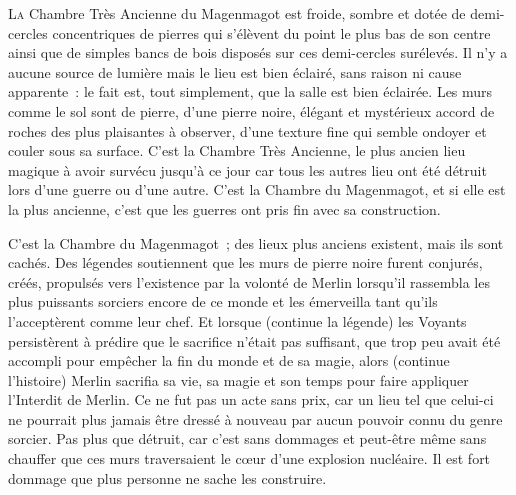 
\lettrine{L}{a} Chambre Très Ancienne du Magenmagot est froide, sombre et dotée de demi-cercles concentriques de pierres qui s'élèvent du point le plus bas de son centre ainsi que de simples bancs de bois disposés sur ces demi-cercles surélevés. Il n'y a aucune source de lumière mais le lieu est bien éclairé, sans raison ni cause apparente~: le fait est, tout simplement, que la salle est bien éclairée. Les murs comme le sol sont de pierre, d'une pierre noire, élégant et mystérieux accord de roches des plus plaisantes à observer, d'une texture fine qui semble ondoyer et couler sous sa surface. C'est la Chambre Très Ancienne, le plus ancien lieu magique à avoir survécu jusqu'à ce jour car tous les autres lieu ont été détruit lors d'une guerre ou d'une autre. C'est la Chambre du Magenmagot, et si elle est la plus ancienne, c'est que les guerres ont pris fin avec sa construction.

C'est la Chambre du Magenmagot~; des lieux plus anciens existent, mais ils sont cachés. Des légendes soutiennent que les murs de pierre noire furent conjurés, créés, propulsés vers l'existence par la volonté de Merlin lorsqu'il rassembla les plus puissants sorciers encore de ce monde et les émerveilla tant qu'ils l'acceptèrent comme leur chef. Et lorsque (continue la légende) les Voyants persistèrent à prédire que le sacrifice n'était pas suffisant, que trop peu avait été accompli pour empêcher la fin du monde et de sa magie, alors (continue l'histoire) Merlin sacrifia sa vie, sa magie et son temps pour faire appliquer l'Interdit de Merlin. Ce ne fut pas un acte sans prix, car un lieu tel que celui-ci ne pourrait plus jamais être dressé à nouveau par aucun pouvoir connu du genre sorcier. Pas plus que détruit, car c'est sans dommages et peut-être même sans chauffer que ces murs traversaient le cœur d'une explosion nucléaire. Il est fort dommage que plus personne ne sache les construire.

